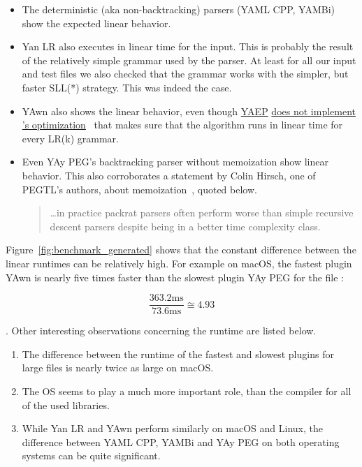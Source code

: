 \begin{itemize}
  \item The deterministic (aka non-backtracking) parsers (YAML CPP, YAMBi) show the expected linear behavior.

  \item Yan LR also executes in linear time for the input. This is probably the result of the relatively simple grammar used by the parser. At least for all our input and test files we also checked that the grammar works with the simpler, but faster \gls{SLL(*)} strategy. This was indeed the case.

  \item YAwn also shows the linear behavior, even though \href{https://github.com/vnmakarov/yaep}{\gls{YAEP}} \href{https://github.com/vnmakarov/yaep/issues/24}{does not implement \citeauthor{leo1991general}’s optimization}~\cite{leo1991general} that makes sure that the algorithm runs in linear time for every LR(k) grammar.

  \item Even YAy PEG’s backtracking parser without memoization show linear behavior. This also corroborates a statement by Colin Hirsch, one of PEGTL’s authors, about memoization~\cite{hirsch2016memo}, quoted below.

  \begin{quote}
     …in practice packrat parsers often perform worse than simple recursive descent parsers despite being in a better time complexity class.
  \end{quote}

\end{itemize}

Figure~\ref{fig:benchmark_generated} shows that the constant difference between the linear runtimes can be relatively high. For example on macOS, the fastest plugin YAwn is nearly five times faster than the slowest plugin YAy PEG for the file \FileGenerated{}:

\begin{equation}
  \frac{363.2\text{ms}}{73.6\text{ms}} ≅ 4.93
  \label{eq:benchmark_difference}
\end{equation}

. Other interesting observations concerning the runtime are listed below.

\begin{enumerate}
  \item The difference between the runtime of the fastest and slowest plugins for large files is nearly twice as large on macOS.

  \item The OS seems to play a much more important role, than the compiler for all of the used  libraries.

  \item While Yan LR and YAwn perform similarly on macOS and Linux, the difference between YAML CPP, YAMBi and YAy PEG on both operating systems can be quite significant.
\end{enumerate}

